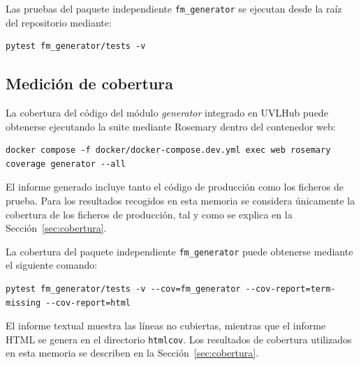 Las pruebas del paquete independiente \texttt{fm\_generator} se ejecutan desde
la raíz del repositorio mediante:

\begin{verbatim}
pytest fm_generator/tests -v
\end{verbatim}

\subsection{Medición de cobertura}

La cobertura del código del módulo \textit{generator} integrado en UVLHub puede
obtenerse ejecutando la suite mediante Rosemary dentro del contenedor web:

\begin{verbatim}
docker compose -f docker/docker-compose.dev.yml exec web rosemary coverage generator --all 
\end{verbatim}

El informe generado incluye tanto el código de producción como los ficheros de
prueba. Para los resultados recogidos en esta memoria se considera únicamente
la cobertura de los ficheros de producción, tal y como se explica en la
Sección~\ref{sec:cobertura}.

La cobertura del paquete independiente \texttt{fm\_generator} puede obtenerse
mediante el siguiente comando:

\begin{verbatim}
pytest fm_generator/tests -v --cov=fm_generator --cov-report=term-missing --cov-report=html
\end{verbatim}

El informe textual muestra las líneas no cubiertas, mientras que el informe HTML
se genera en el directorio \texttt{htmlcov}. Los resultados de cobertura
utilizados en esta memoria se describen en la
Sección~\ref{sec:cobertura}.

